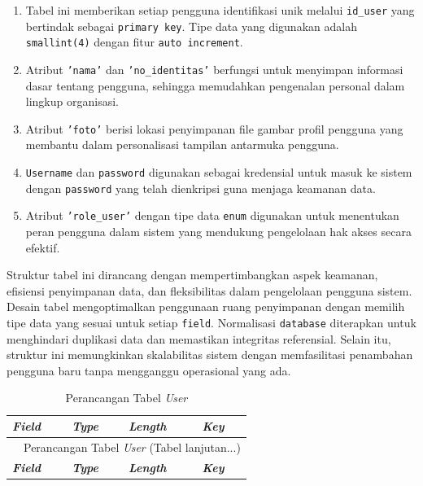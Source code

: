 \begin{enumerate}
	      \begin{enumerate}[label=\alph*.]
		      \item Tabel ini memberikan setiap pengguna identifikasi unik melalui \texttt{id\_user} yang bertindak sebagai \texttt{primary key}. Tipe data yang digunakan adalah \texttt{smallint(4)} dengan fitur \texttt{auto increment}.
		      \item Atribut \texttt{'nama'} dan \texttt{'no\_identitas'} berfungsi untuk menyimpan informasi dasar tentang pengguna, sehingga memudahkan pengenalan personal dalam lingkup organisasi.
		      \item Atribut \texttt{'foto'} berisi lokasi penyimpanan file gambar profil pengguna yang membantu dalam personalisasi tampilan antarmuka pengguna.
		      \item \texttt{Username} dan \texttt{password} digunakan sebagai kredensial untuk masuk ke sistem dengan \texttt{password} yang telah dienkripsi guna menjaga keamanan data.
		      \item Atribut \texttt{'role\_user'} dengan tipe data \texttt{enum} digunakan untuk menentukan peran pengguna dalam sistem yang mendukung pengelolaan hak akses secara efektif.
	      \end{enumerate}

	      Struktur tabel ini dirancang dengan mempertimbangkan aspek keamanan, efisiensi penyimpanan data, dan fleksibilitas dalam pengelolaan pengguna sistem. Desain tabel mengoptimalkan penggunaan ruang penyimpanan dengan memilih tipe data yang sesuai untuk setiap \texttt{field}. Normalisasi \texttt{database} diterapkan untuk menghindari duplikasi data dan memastikan integritas referensial. Selain itu, struktur ini memungkinkan skalabilitas sistem dengan memfasilitasi penambahan pengguna baru tanpa mengganggu operasional yang ada.

		      {
			      \fontsize{10}{13}\selectfont
			      \begin{longtable}{p{3 cm} p{3cm} p{3 cm} p{3.4 cm}}
				      \caption{Perancangan Tabel \textit{User}}
				      \label{admin}                                                                                                    \\
				      \hline
				      \textbf{\textit{Field}} & \textbf{\textit{Type}} & \textbf{\textit{Length}}        & \textbf{\textit{Key}}       \\
				      \hline
				      \endfirsthead

				      \multicolumn{4}{c}{\tablename\ \thetable\ {Perancangan Tabel \textit{User}} \space (Tabel lanjutan...)}          \\
				      \hline
				      \textbf{\textit{Field}} & \textbf{\textit{Type}} & \textbf{\textit{Length}}        & \textbf{\textit{Key}}       \\
				      \hline
				      \endhead


\end{longtable}}
\end{enumerate}
